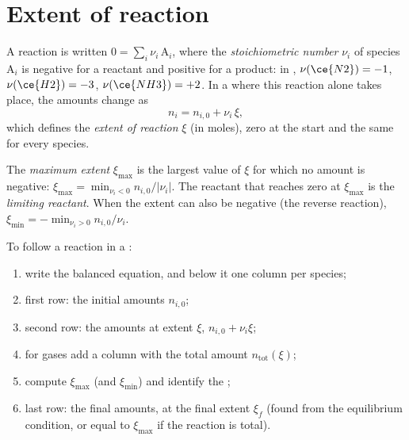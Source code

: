 \section{Extent of reaction}

\begin{definition}\label{def:b1:extent-q-and-k:extent}
A reaction is written $0 = \sum_i \nu_i\,\mathrm{A}_i$, where the
\emph{stoichiometric number} $\nu_i$ of
species $\mathrm{A}_i$ is negative for a reactant and positive for a
product: in , $\nu(\ce{N2}) = -1$, $\nu(\ce{H2}) = -3$,
$\nu(\ce{NH3}) = +2$. In a  where this reaction alone takes
place, the amounts change as
\[
  n_i = n_{i,0} + \nu_i\,\xi ,
\]
which defines the \emph{extent of reaction}
$\xi$ (in moles), zero at the start and the same for every species.
\end{definition}

\begin{definition}\label{def:b1:extent-q-and-k:max-extent}
The \emph{maximum extent} $\xi_{\max}$ is the largest
value of $\xi$ for which no amount is negative: $\xi_{\max} = \min_{\nu_i <
0} n_{i,0}/|\nu_i|$. The reactant that reaches zero at $\xi_{\max}$ is the
\emph{limiting reactant}. When the extent can
also be negative (the reverse reaction), $\xi_{\min} = -\min_{\nu_i > 0}
n_{i,0}/\nu_i$.
\end{definition}

\begin{method}\label{met:b1:extent-q-and-k:progress-table}
To follow a reaction in a :
\begin{enumerate}
  \item write the balanced equation, and below it one column per species;
  \item first row: the initial amounts $n_{i,0}$;
  \item second row: the amounts at extent $\xi$, $n_{i,0} + \nu_i\xi$;
  \item for gases add a column with the total amount $n_{\text{tot}}(\xi)$;
  \item compute $\xi_{\max}$ (and $\xi_{\min}$) and identify the ;
  \item last row: the final amounts, at the final extent $\xi_f$ (found
        from the equilibrium condition, or equal to $\xi_{\max}$ if the
        reaction is total).
\end{enumerate}
\end{method}

